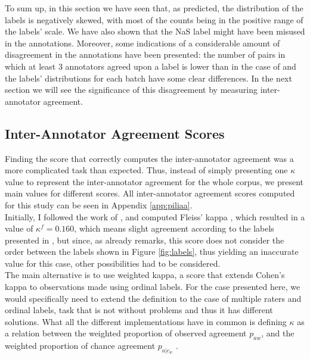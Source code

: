 To sum up, in this section we have seen that, as predicted, the distribution of the labels is negatively skewed, with most of the counts being in the positive range of the labels' scale. We have also shown that the NaS label might have been misused in the annotations. Moreover, some indications of a considerable amount of disagreement in the annotations have been presented: the number of pairs in which at least 3 annotators agreed upon a label is lower than in the case of \citet{de2012did} and the labels' distributions for each batch have some clear differences. In the next section we will see the significance of this disagreement by measuring inter-annotator agreement.\\ 

\subsection{Inter-Annotator Agreement Scores}

Finding the score that correctly computes the inter-annotator agreement was a more complicated task than expected. Thus, instead of simply presenting one $\kappa$ value to represent the inter-annotator agreement for the whole corpus, we present main values for different scores. All inter-annotator agreement scores computed for this study can be seen in Appendix \ref{app:piliaa}.\\

Initially, I followed the work of \citet{de2012did}, and computed Fleiss' kappa \citep{fleiss1971measuring}, which resulted in a value of $\kappa^{f} = 0.160$, which means slight agreement according to the labels presented in \citet{shrout1998measurement}, but since, as \citet{de2012did} already remarks, this score does not consider the order between the labels shown in Figure \ref{fig:labels}, thus yielding an inaccurate value for this case, other possibilities had to be considered.\\

The main alternative is to use weighted kappa, a score that extends Cohen's kappa \citep{cohen1960coefficient} to observations made using ordinal labels. For the case presented here, we would specifically need to extend the definition to the case of multiple raters and ordinal labels, task that  is not without problems \citep{berry2008weighted,nelson2015measures} and thus it has different solutions. What all the different implementations have in common is defining $\kappa$ as a relation between the weighted proportion of observed agreement $p_{aw}$, and the weighted proportion of chance agreement $p_{a|c_w}$ \citep{vanacore2022robustness}.\\

